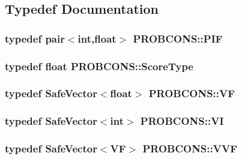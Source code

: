 \subsection{Typedef Documentation}
\hypertarget{namespace_p_r_o_b_c_o_n_s_a397767dfc075ae6ba7e480f5f06edc32}{
\subsubsection[{P\+I\+F}]{\setlength{\rightskip}{0pt plus 5cm}typedef pair$<$int,float$>$ {\bf P\+R\+O\+B\+C\+O\+N\+S\+::\+P\+I\+F}}}\label{namespace_p_r_o_b_c_o_n_s_a397767dfc075ae6ba7e480f5f06edc32}
\hypertarget{namespace_p_r_o_b_c_o_n_s_a93b8c2a0a0de0dd3d36b847946ed288c}{
\subsubsection[{Score\+Type}]{\setlength{\rightskip}{0pt plus 5cm}typedef float {\bf P\+R\+O\+B\+C\+O\+N\+S\+::\+Score\+Type}}}\label{namespace_p_r_o_b_c_o_n_s_a93b8c2a0a0de0dd3d36b847946ed288c}
\hypertarget{namespace_p_r_o_b_c_o_n_s_a7d46b91dfef3fa4038545a492ad12221}{
\subsubsection[{V\+F}]{\setlength{\rightskip}{0pt plus 5cm}typedef {\bf Safe\+Vector}$<$float$>$ {\bf P\+R\+O\+B\+C\+O\+N\+S\+::\+V\+F}}}\label{namespace_p_r_o_b_c_o_n_s_a7d46b91dfef3fa4038545a492ad12221}
\hypertarget{namespace_p_r_o_b_c_o_n_s_af5836390f1b6599e5a0337a7dcd4b5d7}{
\subsubsection[{V\+I}]{\setlength{\rightskip}{0pt plus 5cm}typedef {\bf Safe\+Vector}$<$int$>$ {\bf P\+R\+O\+B\+C\+O\+N\+S\+::\+V\+I}}}\label{namespace_p_r_o_b_c_o_n_s_af5836390f1b6599e5a0337a7dcd4b5d7}
\hypertarget{namespace_p_r_o_b_c_o_n_s_a64c77882f700f0f6e9426241c7d7ba1c}{
\subsubsection[{V\+V\+F}]{\setlength{\rightskip}{0pt plus 5cm}typedef {\bf Safe\+Vector}$<${\bf V\+F}$>$ {\bf P\+R\+O\+B\+C\+O\+N\+S\+::\+V\+V\+F}}}\label{namespace_p_r_o_b_c_o_n_s_a64c77882f700f0f6e9426241c7d7ba1c}
